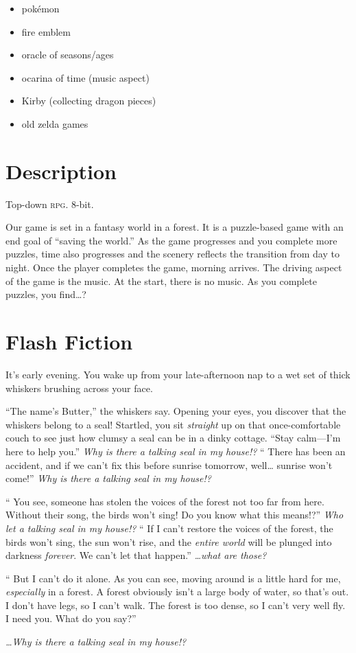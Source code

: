 \documentclass{article}
\begin{document}
\begin{itemize}
\item pok\'emon
\item fire emblem
\item oracle of seasons\slash ages
\item ocarina of time (music aspect)
\item Kirby (collecting dragon pieces)
\item old zelda games
\end{itemize}

\section{Description}
\label{sec:description}

Top-down \textsc{rpg}.
8-bit.

Our game is set in a fantasy world in a forest.
It is a puzzle-based game with an end goal of \enquote{saving the world.}
As the game progresses and you complete more puzzles,
  time also progresses and the scenery reflects the transition from day to night.
Once the player completes the game, morning arrives.
The driving aspect of the game is the music.
At the start, there is no music.
As you complete puzzles, you find\dots ?

\newpage

\section{Flash Fiction}
\label{sec:flash-fiction}

\def\thought{\textsl}

It's early evening.
You wake up from your late-afternoon nap to
  a wet set of thick whiskers
  brushing across your face.

\enquote{The name's Butter,} the whiskers say.
Opening your eyes, you discover that the whiskers belong to a seal!
Startled, you sit \emph{straight} up on that once-comfortable couch
  to see just how clumsy a seal can be in a dinky cottage.
\enquote{Stay calm---I'm here to help you.}
\thought{Why is there a talking seal in my house!?}
\enquote{%
  There has been an accident, and
  if we can't fix this before sunrise tomorrow, well\dots
  sunrise won't come!}
\thought{Why is there a talking seal in my house!?}

\enquote{%
  You see, someone has stolen
  the voices of the forest
  not too far from here.
  Without their song, the birds won't sing!
  Do you know what this means!?}
\thought{Who let a talking seal in my house!?}
\enquote{%
  If I can't restore the
  voices of the forest,
  the birds won't sing,
  the sun won't rise,
  and the \emph{entire world} will be
  plunged into darkness \emph{forever}.
  We can't let that happen.}
\thought{\dots what are those?}

\enquote{%
  But I can't do it alone.
  As you can see, moving around is a little hard for me, \emph{especially} in a forest.
  A forest obviously isn't a large body of water, so that's out.
  I don't have legs, so I can't walk.
  The forest is too dense, so I can't very well fly.
  I need you.
  What do you say?}

\thought{\dots Why is there a talking seal in my house!?}
\end{document}
